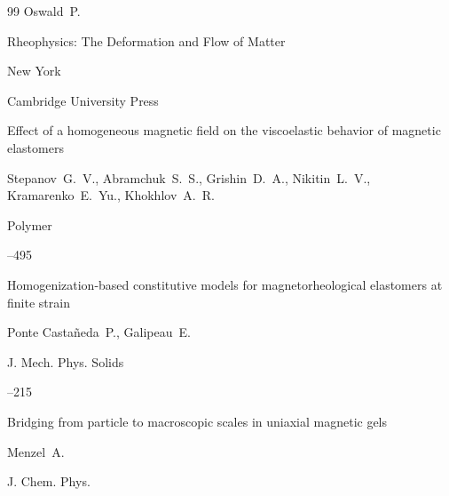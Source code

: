 \begin{thebibliography}{99}
\by Oswald~P.

\book Rheophysics: The Deformation and Flow of Matter

\publaddr New York

\publ Cambridge University Press






\paper Effect of a homogeneous magnetic field on the viscoelastic behavior of magnetic elastomers

\by Stepanov~G.~V., Abramchuk~S.~S., Grishin~D.~A., Nikitin~L.~V., Kramarenko~E.~Yu., Khokhlov~A.~R.

\jour Polymer




--495


 






\paper Homogenization-based constitutive models for magnetorheological elastomers at finite strain

\by Ponte Casta\~neda~P., Galipeau~E.

\jour  J. Mech. Phys. Solids




--215







\paper  Bridging from particle to macroscopic scales in uniaxial magnetic gels

\by Menzel~A.

\jour J. Chem. Phys.





 \nofrills







\end{thebibliography}
